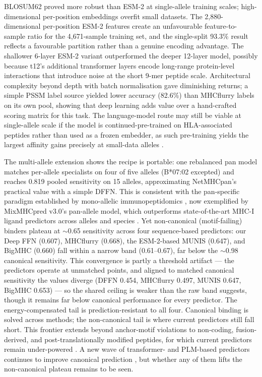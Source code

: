 BLOSUM62 proved more robust than ESM-2 at single-allele training scales; high-dimensional per-position embeddings overfit small datasets. The 2,880-dimensional per-position ESM-2 features create an unfavourable feature-to-sample ratio for the 4,671-sample training set, and the single-split 93.3\% result reflects a favourable partition rather than a genuine encoding advantage. The shallower 6-layer ESM-2 variant outperformed the deeper 12-layer model, possibly because t12's additional transformer layers encode long-range protein-level interactions that introduce noise at the short 9-mer peptide scale. Architectural complexity beyond depth with batch normalisation gave diminishing returns; a simple PSSM label source yielded lower accuracy (82.6\%) than MHCflurry labels on its own pool, showing that deep learning adds value over a hand-crafted scoring matrix for this task. The language-model route may still be viable at single-allele scale if the model is continued-pre-trained on HLA-associated peptides rather than used as a frozen embedder, as such pre-training yields the largest affinity gains precisely at small-data alleles \citep{Mares25}.

The multi-allele extension shows the recipe is portable: one rebalanced pan model matches per-allele specialists on four of five alleles (B*07:02 excepted) and reaches 0.819 pooled sensitivity on 15 alleles, approximating NetMHCpan's practical value with a simple DFFN. This is consistent with the pan-specific paradigm established by mono-allelic immunopeptidomics \citep{Sarkizova20}, now exemplified by MixMHCpred v3.0's pan-allele model, which outperforms state-of-the-art MHC-I ligand predictors across alleles and species \citep{Tadros25}. Yet non-canonical (motif-failing) binders plateau at $\sim$0.65 sensitivity across four sequence-based predictors: our Deep FFN (0.607), MHCflurry (0.668), the ESM-2-based MUNIS (0.647), and BigMHC (0.660) fall within a narrow band (0.61--0.67), far below the $\sim$0.98 canonical sensitivity. This convergence is partly a threshold artifact --- the predictors operate at unmatched points, and aligned to matched canonical sensitivity the values diverge (DFFN 0.454, MHCflurry 0.497, MUNIS 0.647, BigMHC 0.653) --- so the shared ceiling is weaker than the raw band suggests, though it remains far below canonical performance for every predictor. The energy-compensated tail is prediction-resistant to all four. Canonical binding is solved across methods; the non-canonical tail is where current predictors still fall short. This frontier extends beyond anchor-motif violations to non-coding, fusion-derived, and post-translationally modified peptides, for which current predictors remain under-powered \citep{Vo25}. A new wave of transformer- and PLM-based predictors continues to improve canonical prediction \citep{Xu26,Cheng25}, but whether any of them lifts the non-canonical plateau remains to be seen.

